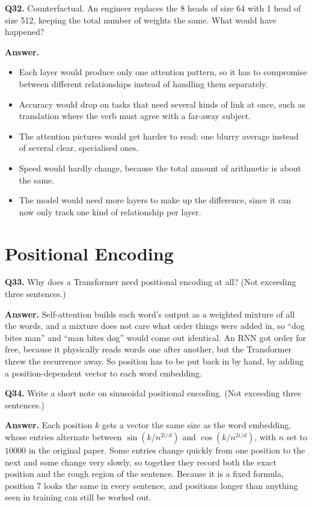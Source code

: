 \documentclass[11pt]{article}
\begin{document}
\medskip
\textbf{Q32.} Counterfactual. An engineer replaces the 8 heads of size 64 with 1 head of size
512, keeping the total number of weights the same. What would have happened?

\textbf{Answer.}
\begin{itemize}
  \item Each layer would produce only one attention pattern, so it has to compromise between different relationships instead of handling them separately.
  \item Accuracy would drop on tasks that need several kinds of link at once, such as translation where the verb must agree with a far-away subject.
  \item The attention pictures would get harder to read: one blurry average instead of several clear, specialised ones.
  \item Speed would hardly change, because the total amount of arithmetic is about the same.
  \item The model would need more layers to make up the difference, since it can now only track one kind of relationship per layer.
\end{itemize}

\section{Positional Encoding}

\textbf{Q33.} Why does a Transformer need positional encoding at all? (Not exceeding three
sentences.)

\textbf{Answer.} Self-attention builds each word's output as a weighted mixture of all the
words, and a mixture does not care what order things were added in, so ``dog bites man'' and
``man bites dog'' would come out identical. An RNN got order for free, because it physically
reads words one after another, but the Transformer threw the recurrence away. So position has
to be put back in by hand, by adding a position-dependent vector to each word embedding.

\medskip
\textbf{Q34.} Write a short note on sinusoidal positional encoding. (Not exceeding three
sentences.)

\textbf{Answer.} Each position $k$ gets a vector the same size as the word embedding, whose
entries alternate between $\sin\!\left(k/n^{2i/d}\right)$ and $\cos\!\left(k/n^{2i/d}\right)$,
with $n$ set to $10000$ in the original paper. Some entries change quickly from one position
to the next and some change very slowly, so together they record both the exact position and
the rough region of the sentence. Because it is a fixed formula, position 7 looks the same in
every sentence, and positions longer than anything seen in training can still be worked out.
\end{document}
